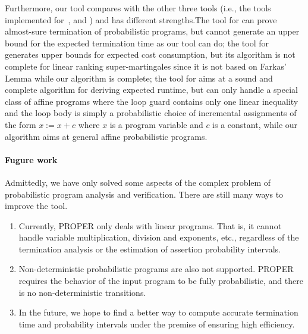 \documentclass[conference]{IEEEtran}
\begin{document}
Furthermore, our tool compares with the other three tools (i.e., the tools implemented for~\cite{Sankaranarayanan2013Static}, \cite{Ngo2018Bounded} and \cite{J2019Computing}) and has different strengths.The tool for \cite{Sankaranarayanan2013Static} can prove almost-sure termination of probabilistic programs, but cannot generate an upper bound for the expected termination time as our tool can do; the tool for \cite{Ngo2018Bounded} generates upper bounds for expected cost consumption, but its algorithm is not complete for linear ranking super-martingales since it is not based on Farkas' Lemma while our algorithm is complete; the tool for \cite{J2019Computing} aims at a sound and complete algorithm for deriving expected runtime, but can only handle a special class of affine programs where the loop guard contains only one linear inequality and the loop body is simply a probabilistic choice of incremental assignments of the form $x:=x+c$ where $x$ is a program variable and $c$ is a constant, while our algorithm aims at general affine probabilistic programs. 

\paragraph{Fugure work}
Admittedly, we have only solved some aspects of the complex problem of probabilistic program analysis and verification. There are still many ways to improve the tool.
\begin{enumerate}
	\item Currently, PROPER only deals with linear programs. That is, it cannot handle variable multiplication, division and exponents, etc., regardless of the termination analysis or the estimation of assertion probability intervals.
	\item Non-deterministic probabilistic programs  are also not supported. PROPER requires the behavior of the input program to be fully probabilistic, and there is no non-deterministic transitions. 
	\item In the future, we hope to find a better way to compute accurate termination time and probability intervals under the premise of ensuring high efficiency. 
\end{enumerate}
\end{document}
